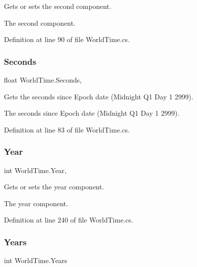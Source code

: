 Gets or sets the second component. 

The second component.

Definition at line 90 of file World\+Time.\+cs.

\mbox{\label{struct_world_time_a25f5283141ffebd02172c733b86714d7}} 
\subsubsection{\texorpdfstring{Seconds}{Seconds}}
{\footnotesize\ttfamily float World\+Time.\+Seconds\hspace{0.3cm}{\ttfamily [get]}, {\ttfamily [set]}}



Gets the seconds since Epoch date (Midnight Q1 Day 1 2999). 

The seconds since Epoch date (Midnight Q1 Day 1 2999).

Definition at line 83 of file World\+Time.\+cs.

\mbox{\label{struct_world_time_a0050f0f2e331b49641207a94c6c83fe2}} 
\subsubsection{\texorpdfstring{Year}{Year}}
{\footnotesize\ttfamily int World\+Time.\+Year\hspace{0.3cm}{\ttfamily [get]}, {\ttfamily [set]}}



Gets or sets the year component. 

The year component.

Definition at line 240 of file World\+Time.\+cs.

\mbox{\label{struct_world_time_a59f52857aaf1f9f7efe9eac2da340970}} 
\subsubsection{\texorpdfstring{Years}{Years}}
{\footnotesize\ttfamily int World\+Time.\+Years\hspace{0.3cm}{\ttfamily [get]}}



